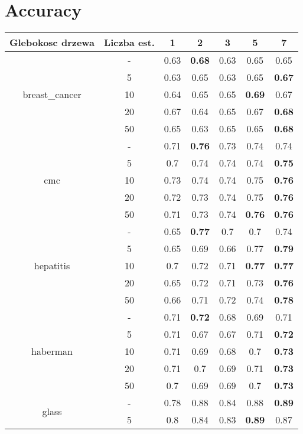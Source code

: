 \documentclass{article}%
\begin{document}
%
\normalsize%
\section*{Accuracy}%
\begin{longtable}{c|c|ccccc}%
\hline%
Glebokosc drzewa&Liczba est.&1&2&3&5&7\\%
\hline%
\multirow{5}{*}{breast\_cancer}&{-}&0.63&\textbf{0.68}&0.63&0.65&0.65\\%
\cline{2%
-%
7}%
&5&0.63&0.65&0.63&0.65&\textbf{0.67}\\%
\cline{2%
-%
7}%
&10&0.64&0.65&0.65&\textbf{0.69}&0.67\\%
\cline{2%
-%
7}%
&20&0.67&0.64&0.65&0.67&\textbf{0.68}\\%
\cline{2%
-%
7}%
&50&0.65&0.63&0.65&0.65&\textbf{0.68}\\%
\hline%
\multirow{5}{*}{cmc}&{-}&0.71&\textbf{0.76}&0.73&0.74&0.74\\%
\cline{2%
-%
7}%
&5&0.7&0.74&0.74&0.74&\textbf{0.75}\\%
\cline{2%
-%
7}%
&10&0.73&0.74&0.74&0.75&\textbf{0.76}\\%
\cline{2%
-%
7}%
&20&0.72&0.73&0.74&0.75&\textbf{0.76}\\%
\cline{2%
-%
7}%
&50&0.71&0.73&0.74&\textbf{0.76}&\textbf{0.76}\\%
\hline%
\multirow{5}{*}{hepatitis}&{-}&0.65&\textbf{0.77}&0.7&0.7&0.74\\%
\cline{2%
-%
7}%
&5&0.65&0.69&0.66&0.77&\textbf{0.79}\\%
\cline{2%
-%
7}%
&10&0.7&0.72&0.71&\textbf{0.77}&\textbf{0.77}\\%
\cline{2%
-%
7}%
&20&0.65&0.72&0.71&0.73&\textbf{0.76}\\%
\cline{2%
-%
7}%
&50&0.66&0.71&0.72&0.74&\textbf{0.78}\\%
\hline%
\multirow{5}{*}{haberman}&{-}&0.71&\textbf{0.72}&0.68&0.69&0.71\\%
\cline{2%
-%
7}%
&5&0.71&0.67&0.67&0.71&\textbf{0.72}\\%
\cline{2%
-%
7}%
&10&0.71&0.69&0.68&0.7&\textbf{0.73}\\%
\cline{2%
-%
7}%
&20&0.71&0.7&0.69&0.71&\textbf{0.73}\\%
\cline{2%
-%
7}%
&50&0.7&0.69&0.69&0.7&\textbf{0.73}\\%
\hline%
\multirow{5}{*}{glass}&{-}&0.78&0.88&0.84&0.88&\textbf{0.89}\\%
\cline{2%
-%
7}%
&5&0.8&0.84&0.83&\textbf{0.89}&0.87\\%

\end{longtable}
\end{document}
